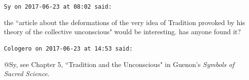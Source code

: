\begin{footnotesize}
\begin{sffamily}
\hfill

\texttt{Sy on 2017-06-23 at 08:02 said: }

the ``article about the deformations of the very idea of Tradition provoked by his theory of the collective unconscious" would be interesting. has anyone found it?


\hfill

\texttt{Cologero on 2017-06-23 at 14:53 said: }

@Sy, see Chapter 5, ``Tradition and the Unconscious" in Guenon's \emph{Symbols of Sacred Science}.


\end{sffamily}\end{footnotesize}
